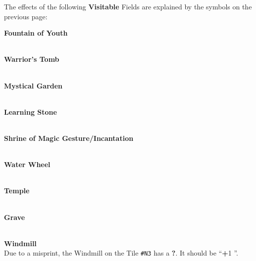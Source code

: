\pagebreak

The effects of the following \textbf{Visitable} Fields are explained by the symbols on the previous page:

\begin{multicols*}{2}
{\centering

  \phantom{j}\textbf{Fountain of Youth}\\
  \\

  \bigskip

  \phantom{j}\textbf{Warrior's Tomb}\\
  \\

  \bigskip

  \textbf{Mystical Garden}\\
  \\

  \bigskip

  \textbf{Learning Stone}\\
  \\

  \bigskip

  \phantom{j}\textbf{Shrine of Magic Gesture/Incantation}\\
  \\
  \filbreak

  \phantom{j}\textbf{Water Wheel}\phantom{j}\\
  \\

  \bigskip

  \phantom{j}\textbf{Temple}\phantom{j}\\
  \\

  \bigskip

  \phantom{j}\textbf{Grave}\phantom{j}\\
  \\

  \bigskip

  \vspace*{-2pt}
  \phantom{j}\textbf{Windmill}\phantom{j}\\
  {\small Due to a misprint, the Windmill on the Tile \texttt{\#N3} has a \textbf{?}. It should be ``\textbf{+}1 ''.}


}
\end{multicols*}
